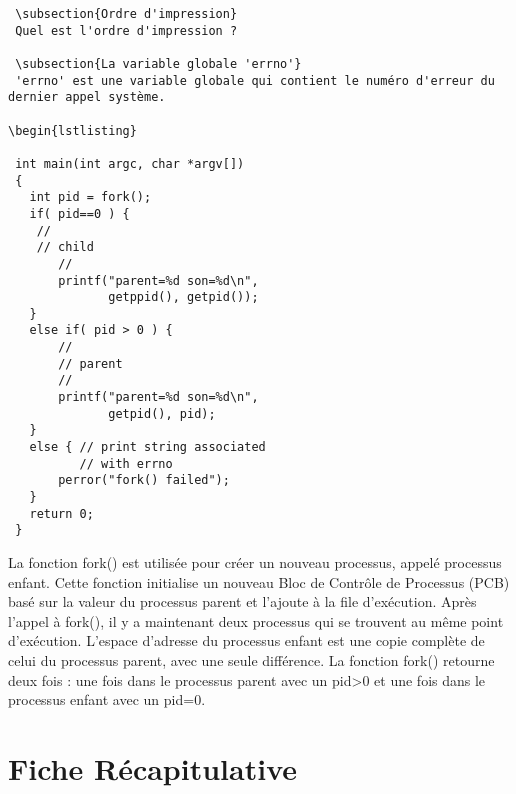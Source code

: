 \documentclass[12pt]{report}
\begin{document}
\begin{lstlisting}
 \subsection{Ordre d'impression} 
 Quel est l'ordre d'impression ? 
 
 \subsection{La variable globale 'errno'} 
 'errno' est une variable globale qui contient le numéro d'erreur du dernier appel système. 

\begin{lstlisting}

 int main(int argc, char *argv[]) 
 { 
   int pid = fork(); 
   if( pid==0 ) { 
    // 
    // child 
       // 
       printf("parent=%d son=%d\n", 
              getppid(), getpid()); 
   } 
   else if( pid > 0 ) { 
       // 
       // parent 
       // 
       printf("parent=%d son=%d\n", 
              getpid(), pid); 
   } 
   else { // print string associated 
          // with errno    
       perror("fork() failed");  
   } 
   return 0; 
 } 

\end{lstlisting}
\begin{tcolorbox}[ 
   colback=yellow!10, 
   colframe=yellow, 
   title={\fontfamily{lmr}\selectfont \faBookmark À retenir}, 
   fonttitle=\bfseries, 
   fontupper=\fontfamily{lmr}\selectfont, 
   boxrule=1pt, 
   sharp corners, 
   ] 
 La fonction fork() est utilisée pour créer un nouveau processus, appelé processus enfant. Cette fonction initialise un nouveau Bloc de Contrôle de Processus (PCB) basé sur la valeur du processus parent et l'ajoute à la file d'exécution. Après l'appel à fork(), il y a maintenant deux processus qui se trouvent au même point d'exécution. L'espace d'adresse du processus enfant est une copie complète de celui du processus parent, avec une seule différence. La fonction fork() retourne deux fois : une fois dans le processus parent avec un pid>0 et une fois dans le processus enfant avec un pid=0. 
 \end{tcolorbox}


\section*{Fiche Récapitulative}
\end{document}
